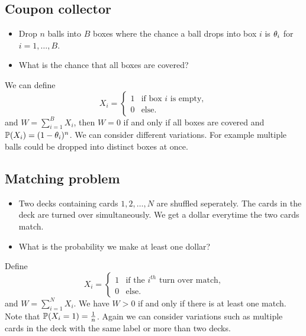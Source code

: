 \subsection{Coupon collector}
\begin{itemize}
    \item Drop $n$ balls into $B$ boxes where the chance a ball drops into box $i$ is ${\theta}_i$ for $i =1,\ldots, B$.
    \item What is the chance that all boxes are covered?
\end{itemize}
We can define 
\[X_i = \begin{cases}
    1 & \text{if box $i$ is empty},\\
    0 & \text{else}.
\end{cases} \]
and $W = \sum_{i=1}^B X_i$, then $W=0$ if and only if all boxes are covered and ${\mathbb{P}}(X_i) = (1-{\theta}_i)^n$. We can consider different variations. For example multiple balls could be dropped into distinct boxes at once.
\subsection{Matching problem}
\begin{itemize}
    \item Two decks containing cards $1,2,\ldots,N$ are shuffled seperately. The cards in the deck are turned over simultaneously. We get a dollar everytime the two cards match.
    \item What is the probability we make at least one dollar?
\end{itemize}
Define 
\[X_i = \begin{cases}
    1 & \text{if the $i^{th}$ turn over match,}\\
    0 &  \text{else.}
\end{cases} \]
and $W = \sum_{i=1}^N X_i$. We have $W > 0$ if and only if there is at least one match. Note that ${\mathbb{P}}(X_i=1)= \frac{1}{n}$. Again we can consider variations such as multiple cards in the deck with the same label or more than two decks.
